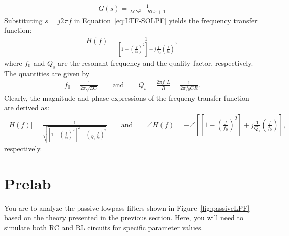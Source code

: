%
 \begin{align}
   G(s) = \frac{1}{LCs^2+ RCs + 1}
  \label{eq:LTF-SOLPF}
\end{align}
%
Substituting $s=j2\pi f$ in Equation~\eqref{eq:LTF-SOLPF} yields the frequency transfer function: %
%
%
\begin{align}
  H(f) =  \frac{1}{\left[1-\left(\frac{f}{f_0}\right)^2\right]+j\frac{1}{Q_s}\left(\frac{f}{f_0}\right)},
  \label{eq:FTF-RC}
\end{align}
%
where $f_0$ and $Q_s$ are the resonant frequency and the quality factor, respectively. The quantities are given by %
%
\begin{align*}
  f_0 = \frac{1}{2\pi\sqrt{LC}}\qquad\text{and}\qquad 
      Q_s = \frac{2\pi f_0 L}{R} = \frac{1}{2\pi f_0CR}.
\end{align*}
%
Clearly, the magnitude and phase expressions of the frequeny transfer function are derived as:  %
%
\begin{align*}
  \left | H(f) \right | = \frac{1}{\sqrt{\left[1-\left(\frac{f}{f_0}\right)^2\right]^2+\left(\frac{1}{Q_s}\frac{f}{f_0}\right)^2}}\qquad\text{and}\qquad
  \angle{H(f)} = - \angle\left[\left[1-\left(\frac{f}{f_0}\right)^2\right]+j\frac{1}{Q_s}\left(\frac{f}{f_0}\right)\right],
\end{align*}
%
respectively. 



\section{Prelab}
\label{sec:prelab}

You are to analyze the passive lowpass filters  shown in Figure~\ref{fig:passiveLPF} based on the theory presented in the previous section. Here, you will need to simulate both RC and RL circuits for specific parameter values.  


